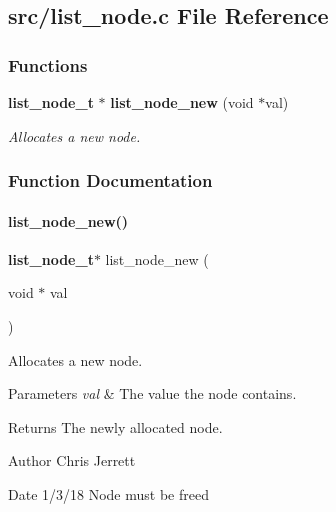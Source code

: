 \subsection{src/list\+\_\+node.c File Reference}
\label{list__node_8c}
\subsubsection*{Functions}
\begin{DoxyCompactItemize}
\item 
\textbf{ list\+\_\+node\+\_\+t} $\ast$ \textbf{ list\+\_\+node\+\_\+new} (void $\ast$val)
\begin{DoxyCompactList}\small\item\em Allocates a new node. \end{DoxyCompactList}\end{DoxyCompactItemize}


\subsubsection{Function Documentation}
\mbox{\label{list__node_8c_a4ef36e0519514ac481d0d7e0b439d431}} 
\paragraph{list\+\_\+node\+\_\+new()}
{\footnotesize\ttfamily \textbf{ list\+\_\+node\+\_\+t}$\ast$ list\+\_\+node\+\_\+new (\begin{DoxyParamCaption}\item[{void $\ast$}]{val }\end{DoxyParamCaption})}



Allocates a new node. 


\begin{DoxyParams}{Parameters}
{\em val} & The value the node contains. \\
\hline
\end{DoxyParams}
\begin{DoxyReturn}{Returns}
The newly allocated node. 
\end{DoxyReturn}
\begin{DoxyAuthor}{Author}
Chris Jerrett 
\end{DoxyAuthor}
\begin{DoxyDate}{Date}
1/3/18 Node must be freed 
\end{DoxyDate}


